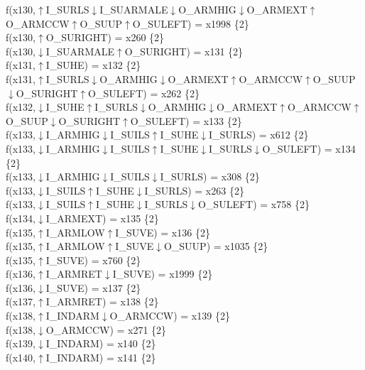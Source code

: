 f(x130,$\uparrow$I\_SURLS$\downarrow$I\_SUARMALE$\downarrow$O\_ARMHIG$\downarrow$O\_ARMEXT$\uparrow$O\_ARMCCW$\uparrow$O\_SUUP$\uparrow$O\_SULEFT) = x1998 \{2\} \\  
f(x130,$\uparrow$O\_SURIGHT) = x260 \{2\} \\  
f(x130,$\downarrow$I\_SUARMALE$\uparrow$O\_SURIGHT) = x131 \{2\} \\  
f(x131,$\uparrow$I\_SUHE) = x132 \{2\} \\  
f(x131,$\uparrow$I\_SURLS$\downarrow$O\_ARMHIG$\downarrow$O\_ARMEXT$\uparrow$O\_ARMCCW$\uparrow$O\_SUUP$\downarrow$O\_SURIGHT$\uparrow$O\_SULEFT) = x262 \{2\} \\  
f(x132,$\downarrow$I\_SUHE$\uparrow$I\_SURLS$\downarrow$O\_ARMHIG$\downarrow$O\_ARMEXT$\uparrow$O\_ARMCCW$\uparrow$O\_SUUP$\downarrow$O\_SURIGHT$\uparrow$O\_SULEFT) = x133 \{2\} \\  
f(x133,$\downarrow$I\_ARMHIG$\downarrow$I\_SUILS$\uparrow$I\_SUHE$\downarrow$I\_SURLS) = x612 \{2\} \\  
f(x133,$\downarrow$I\_ARMHIG$\downarrow$I\_SUILS$\uparrow$I\_SUHE$\downarrow$I\_SURLS$\downarrow$O\_SULEFT) = x134 \{2\} \\  
f(x133,$\downarrow$I\_ARMHIG$\downarrow$I\_SUILS$\downarrow$I\_SURLS) = x308 \{2\} \\  
f(x133,$\downarrow$I\_SUILS$\uparrow$I\_SUHE$\downarrow$I\_SURLS) = x263 \{2\} \\  
f(x133,$\downarrow$I\_SUILS$\uparrow$I\_SUHE$\downarrow$I\_SURLS$\downarrow$O\_SULEFT) = x758 \{2\} \\  
f(x134,$\downarrow$I\_ARMEXT) = x135 \{2\} \\  
f(x135,$\uparrow$I\_ARMLOW$\uparrow$I\_SUVE) = x136 \{2\} \\  
f(x135,$\uparrow$I\_ARMLOW$\uparrow$I\_SUVE$\downarrow$O\_SUUP) = x1035 \{2\} \\  
f(x135,$\uparrow$I\_SUVE) = x760 \{2\} \\  
f(x136,$\uparrow$I\_ARMRET$\downarrow$I\_SUVE) = x1999 \{2\} \\  
f(x136,$\downarrow$I\_SUVE) = x137 \{2\} \\  
f(x137,$\uparrow$I\_ARMRET) = x138 \{2\} \\  
f(x138,$\uparrow$I\_INDARM$\downarrow$O\_ARMCCW) = x139 \{2\} \\  
f(x138,$\downarrow$O\_ARMCCW) = x271 \{2\} \\  
f(x139,$\downarrow$I\_INDARM) = x140 \{2\} \\  
f(x140,$\uparrow$I\_INDARM) = x141 \{2\} \\  
